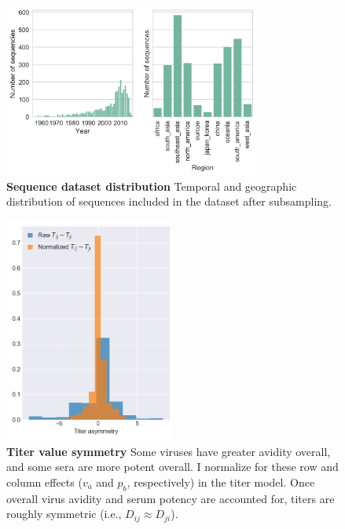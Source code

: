 \begin{figure}[ht!]
\centering
	\includegraphics[width=0.75\textwidth]{./png/sequence_distribution.png}
	\caption[Sequence dataset distribution]{\textbf{Sequence dataset distribution }
  Temporal and geographic distribution of sequences included in the dataset after subsampling.
	}
	\label{sequence_distribution}
\end{figure}

\begin{figure}[ht!]
  \centering
  \includegraphics[width=0.5\textwidth]{./png/titer_asymmetry.png}
  \caption[Titer value symmetry]{\textbf{Titer value symmetry }
  Some viruses have greater avidity overall, and some sera are more potent overall.
  I normalize for these row and column effects ($v_a$ and $p_b$, respectively) in the titer model.
  Once overall virus avidity and serum potency are accounted for, titers are roughly symmetric (i.e., $D_{ij} \approx D_{ji}$).
  }
\label{titer_asymmetry}
\end{figure}

